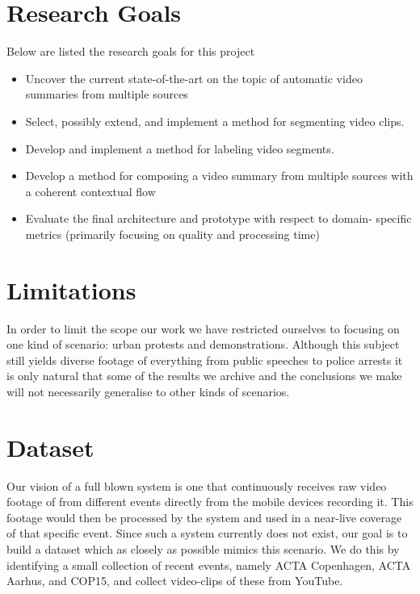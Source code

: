 \section{Research Goals}
%
Below are listed the research goals for this project
%
\begin{itemize}
\item Uncover the current state-of-the-art on the topic of automatic video summaries from multiple sources
\item Select, possibly extend, and implement a method for segmenting video clips.
\item Develop and implement a method for labeling video segments.
\item Develop a method for composing a video summary from multiple sources with a coherent contextual flow
\item Evaluate the final architecture and prototype with respect to domain- specific metrics (primarily focusing on quality and processing time)
\end{itemize}
%
\section{Limitations}
%
In order to limit the scope our work we have restricted ourselves to focusing on one kind of scenario: urban protests and demonstrations. Although this subject still yields diverse footage of everything from public speeches to police arrests it is only natural that some of the results we archive and the conclusions we make will not necessarily generalise to other kinds of scenarios.
%
\section{Dataset}\label{sec:dataset}
%
Our vision of a full blown system is one that continuously receives raw video footage of from different events directly from the mobile devices recording it. This footage would then be processed by the system and used in a near-live coverage of that specific event. Since such a system currently does not exist, our goal is to build a dataset which as closely as possible mimics this scenario. We do this by identifying a small collection of recent events, namely ACTA Copenhagen, ACTA Aarhus, and COP15, and collect video-clips of these from YouTube.
%
